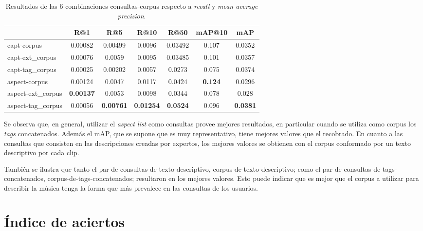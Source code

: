 \begin{table}[h]
    \footnotesize
    \centering
    \begin{tabular} { | l | c | c | c | c | c | c | }
    \hline
                      &   R@1           &   R@5   &   R@10         &   R@50          & mAP@10        &   mAP   \\ 
    \hline
    capt-corpus       & 0.00082         & 0.00499 & 0.0096         & 0.03492         & 0.107         & 0.0352 \\
    capt-ext\_corpus   & 0.00076         & 0.0059  & 0.0095         & 0.03485        & 0.101         & 0.0357  \\ 
    capt-tag\_corpus   & 0.00025         & 0.00202 & 0.0057         & 0.0273         & 0.075         & 0.0374  \\ 
    aspect-corpus     & 0.00124         & 0.0047  & 0.0117         & 0.0424          &\textbf{0.124} & 0.0296 \\ 
    aspect-ext\_corpus &\textbf{0.00137} & 0.0053  & 0.0098         & 0.0344         & 0.078         & 0.028 \\ 
    aspect-tag\_corpus & 0.00056 &\textbf{0.00761} &\textbf{0.01254} &\textbf{0.0524} & 0.096 &\textbf{0.0381} \\ 
    \hline
    \end{tabular}
    \caption{Resultados de las 6 combinaciones consultas-corpus	respecto a \textit{recall} y \textit{mean average precision}.}
    \label{tab:results}
\end{table}

Se observa que, en general, utilizar el \textit{aspect list} como consultas provee mejores resultados, en particular cuando se utiliza como corpus los \textit{tags} concatenados. Además el mAP, que se supone que es muy representativo, tiene mejores valores que el recobrado. En cuanto a las consultas que consisten en las descripciones creadas por expertos, los mejores valores se obtienen con el corpus conformado por un texto descriptivo por cada clip. 

También se ilustra que tanto el par de consultas-de-texto-descriptivo, corpus-de-texto-descriptivo; como el par de consultas-de-tags-concatenados, corpus-de-tags-concatenados; resultaron en los mejores valores. Esto puede indicar que es mejor que el corpus a utilizar para describir la música tenga la forma que más prevalece en las consultas de los usuarios. 

\section{Índice de aciertos}
\label{sec:experiment2}

